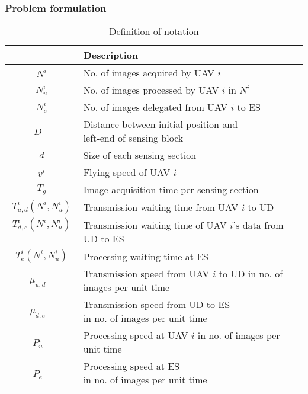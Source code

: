 \documentclass{ieeeaccess}
\begin{document}
\subsubsection{Problem formulation}

\begin{table}[t]
\centering
\caption{Definition of notation}
  \begin{tabular}{|c|l|} \hline
 & Description
 \\ \hline
 $N^i$ & No. of images acquired by UAV $i$ \\ \hline
 $N_u^i$ & No. of images processed by UAV $i$ in $N^i$ \\ \hline
 $N_e^i$ & No. of images delegated from UAV $i$ to ES   \\ \hline
 \shortstack[l]{$D$\\ ~}& \shortstack[l]{Distance between initial position and \\left-end of sensing block} \\ \hline
 $d$ & Size of each sensing section     \\ \hline
  $v^{i}$ & Flying speed of UAV $i$    \\ \hline
 $T_g$ & Image acquisition time per sensing section \\ \hline
  $T_{u,d}^{i}(N^i,N_u^i)$ & Transmission waiting time from UAV $i$ to UD  \\ \hline
 \shortstack[l]{$T_{d,e}^{i}(N^i,N_u^i)$\\ ~} & \shortstack[l]{Transmission waiting time of UAV $i$'s data\\from UD to ES}  \\ \hline
 $T_e^{i}(N^i,N_u^i)$ & Processing waiting time at ES  \\ \hline
 \shortstack[l]{$\mu_{u,d}$\\ ~} & \shortstack[l]{Transmission speed from UAV $i$ to UD\\in no. of images per unit time} \\ \hline
 \shortstack[l]{$\mu_{d,e}$\\ ~} &  \shortstack[l]{Transmission speed from UD to ES\\in no. of images per unit time} \\ \hline
 \shortstack[l]{$P_u^i$\\ ~} &  \shortstack[l]{Processing speed at UAV $i$\\in no. of images per unit time} \\ \hline
 \shortstack[l]{$P_e$\\ ~} &   \shortstack[l]{Processing speed at ES\\in no. of images per unit time} \\ \hline
\end{tabular}
\label{para}
\end{table}
\end{document}
